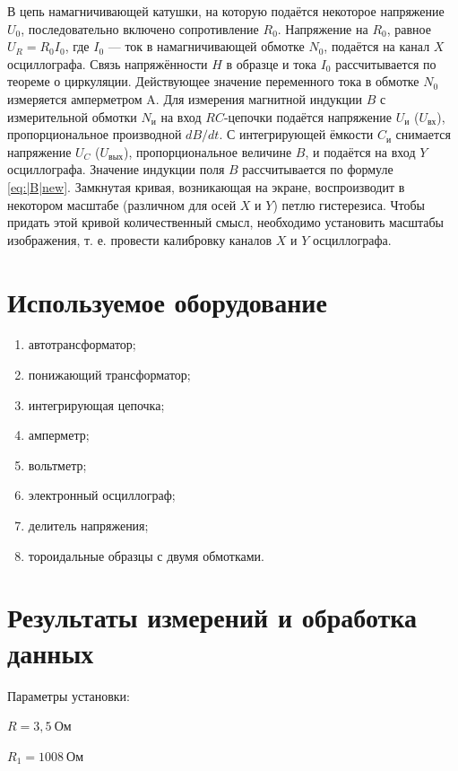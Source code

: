 \documentclass[a4paper, 12pt]{article}
\begin{document}
В цепь намагничивающей катушки, на которую подаётся некоторое
напряжение $U_0$, последовательно включено сопротивление $R_0$. Напряжение на $R_0$, равное $U_R = R_0I_0$, где $I_0$ — ток в намагничивающей обмотке $N_0$, подаётся на канал $ X $ осциллографа. Связь напряжённости $ H $ в
образце и тока $I_0$ рассчитывается по теореме о циркуляции. 
Действующее значение переменного тока в обмотке $N_0$ измеряется амперметром A.
Для измерения магнитной индукции $ B $ с измерительной обмотки $N_\text{и}$
на вход $ RC $-цепочки подаётся напряжение $U_\text{и}$ ($U_{\text{вх}}$), пропорциональное
производной $ dB/dt $. С интегрирующей ёмкости $C_\text{и}$ снимается напряжение $U_C$ ($U_{\text{вых}}$), пропорциональное величине $ B $, и подаётся на вход $ Y $
осциллографа. Значение индукции поля $ B $ рассчитывается по формуле \eqref{eq:|B|new}.
Замкнутая кривая, возникающая на экране, воспроизводит в некотором масштабе (различном для осей $ X $ и $ Y $) петлю гистерезиса. Чтобы придать этой кривой количественный смысл, необходимо установить
масштабы изображения, т. е. провести калибровку каналов $ X $ и $ Y $ осциллографа.
  	
\section{Используемое оборудование}

\begin{enumerate}
    \item автотрансформатор;
    \item понижающий трансформатор;
    \item интегрирующая цепочка;
    \item амперметр;
    \item вольтметр;
    \item электронный осциллограф;
    \item делитель напряжения;
    \item тороидальные образцы с двумя обмотками.
\end{enumerate}

\section{Результаты измерений и обработка данных}

Параметры установки:
\begin{description}
\item{} $R = 3,5~Ом$
\item{} $R_1 = 1008~Ом$
\end{description}
\end{document}
